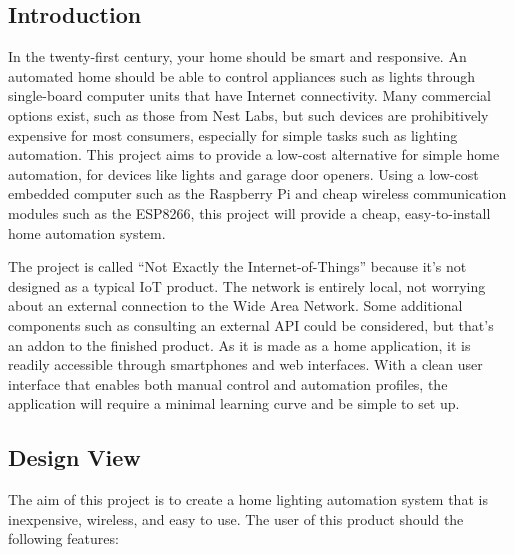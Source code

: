 \subsection{Introduction}

In the twenty-first century, your home should be smart and responsive. An
automated home should be able to control appliances such as lights through
single-board computer units that have Internet connectivity. Many commercial
options exist, such as those from Nest Labs, but such devices are prohibitively
expensive for most consumers, especially for simple tasks such as lighting
automation. This project aims to provide a low-cost alternative for simple home
automation, for devices like lights and garage door openers. Using a low-cost
embedded computer such as the Raspberry Pi and cheap wireless communication
modules such as the ESP8266, this project will provide a cheap, easy-to-install
home automation system.

The project is called ``Not Exactly the Internet-of-Things'' because it's not
designed as a typical IoT product. The network is entirely local, not worrying
about an external connection to the Wide Area Network. Some additional
components such as consulting an external API could be considered, but that's
an addon to the finished product. As it is made as a home application, it is
readily accessible through smartphones and web interfaces. With a clean user
interface that enables both manual control and automation profiles, the
application will require a minimal learning curve and be simple to set up.  

\subsection{Design View}

The aim of this project is to create a home lighting automation system that is
inexpensive, wireless, and easy to use. The user of this product should the
following features:

